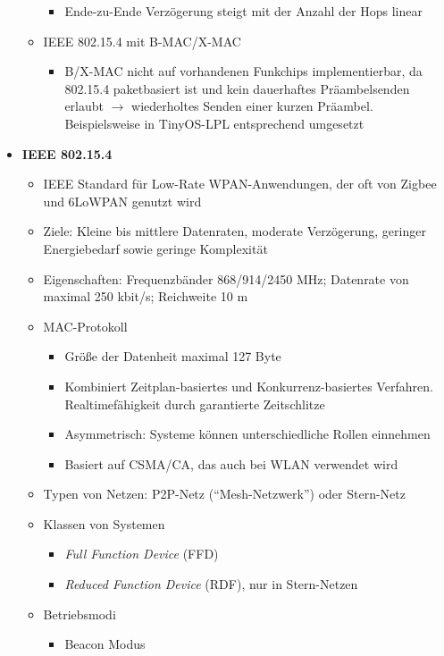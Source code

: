 \begin{itemize}
\begin{itemize}
\begin{itemize}
			\item Ende-zu-Ende Verzögerung steigt mit der Anzahl der Hops linear
		\end{itemize}
		\item IEEE 802.15.4 mit B-MAC/X-MAC
		\begin{itemize}
			\item B/X-MAC nicht auf vorhandenen Funkchips implementierbar, da 802.15.4 paketbasiert ist und kein dauerhaftes Präambelsenden erlaubt \(\rightarrow\) wiederholtes Senden einer kurzen Präambel. Beispielsweise in TinyOS-LPL entsprechend umgesetzt
		\end{itemize}
	\end{itemize}
	\item \textbf{IEEE 802.15.4}
	\begin{itemize}
		\item IEEE Standard für Low-Rate WPAN-Anwendungen, der oft von Zigbee und 6LoWPAN genutzt wird
		\item Ziele: Kleine bis mittlere Datenraten, moderate Verzögerung, geringer Energiebedarf sowie geringe Komplexität
		\item Eigenschaften: Frequenzbänder 868/914/2450 MHz; Datenrate von maximal 250 kbit/s; Reichweite 10 m
		\item MAC-Protokoll
		\begin{itemize}
			\item Größe der Datenheit maximal 127 Byte
			\item Kombiniert Zeitplan-basiertes und Konkurrenz-basiertes Verfahren. Realtimefähigkeit durch garantierte Zeitschlitze
			\item Asymmetrisch: Systeme können unterschiedliche Rollen einnehmen
			\item Basiert auf CSMA/CA, das auch bei WLAN verwendet wird
		\end{itemize}
		\item Typen von Netzen: P2P-Netz ("`Mesh-Netzwerk"') oder Stern-Netz
		\item Klassen von Systemen
		\begin{itemize}
			\item \textit{Full Function Device} (FFD)
			\item \textit{Reduced Function Device} (RDF), nur in Stern-Netzen
		\end{itemize}
		\item Betriebsmodi
		\begin{itemize}
			\item Beacon Modus
			\begin{itemize}

\end{itemize}
\end{itemize}
\end{itemize}
\end{itemize}
